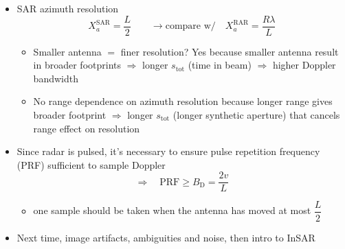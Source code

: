 \documentclass[11pt, oneside]{article}
\newcommand{\BD}{B_\mathrm{D}}
\newcommand{\stot}{s_\mathrm{tot}}
\newcommand{\XSAR}{X_a^\mathrm{SAR}}
\newcommand{\XRAR}{X_a^\mathrm{RAR}}
\begin{document}
\begin{itemize}
	\item SAR azimuth resolution
	\begin{equation}
		\label{e:compare}
		\XSAR = \frac{L}{2} \qquad \rightarrow \text{compare w/} \quad \XRAR = \frac{R\lambda}{L}
	\end{equation}
	\begin{itemize}
		\item[--] Smaller antenna $=$ finer resolution? Yes because smaller antenna result in broader footprints $\Rightarrow$ longer $\stot$ (time in beam) $\Rightarrow$ higher Doppler bandwidth
		\item[--] No range dependence on azimuth resolution because longer range gives broader footprint $\Rightarrow$ longer $\stot$ (longer synthetic aperture) that cancels range effect on resolution
	\end{itemize}
	\item Since radar is pulsed, it's necessary to ensure pulse repetition frequency (PRF) sufficient to sample Doppler
	\begin{equation}
		\label{e:PRF}
		\Rightarrow\quad \mathrm{PRF} \ge \BD = \frac{2v}{L}
	\end{equation}
	\begin{itemize}
		\item[$\Rightarrow$] one sample should be taken when the antenna has moved at most $\dfrac{L}{2}$
	\end{itemize}
	\item Next time, image artifacts, ambiguities and noise, then intro to InSAR
\end{itemize}
\end{document}
